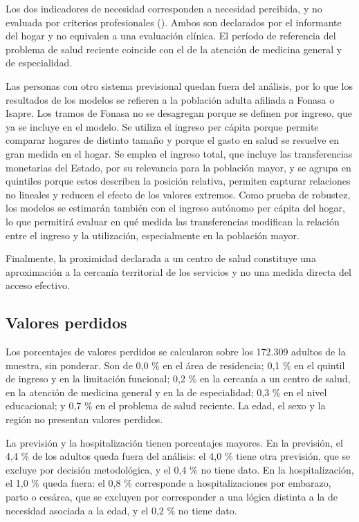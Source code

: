 \documentclass[
  spanish,
  a4paper,
  oneside]{scrbook}
\begin{document}
Los dos indicadores de necesidad corresponden a necesidad percibida, y
no evaluada por criterios profesionales
(). Ambos son
declarados por el informante del hogar y no equivalen a una evaluación
clínica. El período de referencia del problema de salud reciente
coincide con el de la atención de medicina general y de especialidad.

Las personas con otro sistema previsional quedan fuera del análisis, por
lo que los resultados de los modelos se refieren a la población adulta
afiliada a Fonasa o Isapre. Los tramos de Fonasa no se desagregan porque
se definen por ingreso, que ya se incluye en el modelo. Se utiliza el
ingreso per cápita porque permite comparar hogares de distinto tamaño y
porque el gasto en salud se resuelve en gran medida en el hogar. Se
emplea el ingreso total, que incluye las transferencias monetarias del
Estado, por su relevancia para la población mayor, y se agrupa en
quintiles porque estos describen la posición relativa, permiten capturar
relaciones no lineales y reducen el efecto de los valores extremos. Como
prueba de robustez, los modelos se estimarán también con el ingreso
autónomo per cápita del hogar, lo que permitirá evaluar en qué medida
las transferencias modifican la relación entre el ingreso y la
utilización, especialmente en la población mayor.

Finalmente, la proximidad declarada a un centro de salud constituye una
aproximación a la cercanía territorial de los servicios y no una medida
directa del acceso efectivo.

\subsection{Valores perdidos}\label{valores-perdidos}

Los porcentajes de valores perdidos se calcularon sobre los 172.309
adultos de la muestra, sin ponderar. Son de 0,0 \% en el área de
residencia; 0,1 \% en el quintil de ingreso y en la limitación
funcional; 0,2 \% en la cercanía a un centro de salud, en la atención de
medicina general y en la de especialidad; 0,3 \% en el nivel
educacional; y 0,7 \% en el problema de salud reciente. La edad, el sexo
y la región no presentan valores perdidos.

La previsión y la hospitalización tienen porcentajes mayores. En la
previsión, el 4,4 \% de los adultos queda fuera del análisis: el 4,0 \%
tiene otra previsión, que se excluye por decisión metodológica, y el 0,4
\% no tiene dato. En la hospitalización, el 1,0 \% queda fuera: el 0,8
\% corresponde a hospitalizaciones por embarazo, parto o cesárea, que se
excluyen por corresponder a una lógica distinta a la de necesidad
asociada a la edad, y el 0,2 \% no tiene dato.
\end{document}
